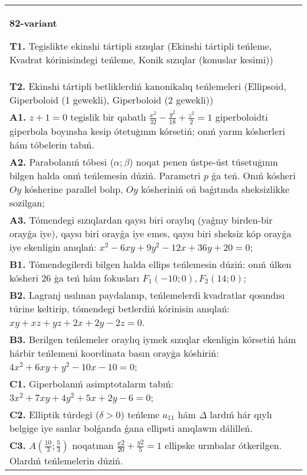 \documentclass{article}
\begin{document}
\begin{tabular}{m{17cm}}
\textbf{82-variant}
\newline

\textbf{T1.} Tegislikte ekinshi tártipli sızıqlar (Ekinshi tártipli teńleme, Kvadrat kórinisindegi teńleme, Konik sızıqlar (konuslar kesimi)) \\
\textbf{T2.} Ekinshi tártipli betliklerdiń kanonikalıq teńlemeleri (Ellipsoid, Giperboloid (1 gewekli), Giperboloid (2 gewekli)) \\
\textbf{A1.} $z+1=0$ tegislik bir qabatlı $\frac{x^2}{32}-\frac{y^2}{18}+\frac{z^2}{2}=1$ giperboloidti giperbola boyınsha kesip ótetuģının kórsetiń; onıń yarım kósherleri hám tóbelerin tabıń. \\
\textbf{A2.} Parabolanıń tóbesi ($\alpha;\beta$) noqat penen ústpe-úst túsetuģının bilgen halda onıń teńlemesin dúziń. Parametri $p$ ǵa teń. Onıń kósheri $O y$ kósherine parallel bolıp, $O y$ kósheriniń oń baǵıtında sheksizlikke sozilgan; \\
\textbf{A3.} Tómendegi sızıqlardan qaysı biri oraylıq (yaǵnıy birden-bir orayǵa iye), qaysı biri orayǵa iye emes, qaysı biri sheksiz kóp orayǵa iye ekenligin anıqlań: $x^2-6 x y+9 y^2-12 x+36 y+20=0$; \\
\textbf{B1.} Tómendegilerdi bilgen halda ellips teńlemesin dúziń: onıń úlken kósheri 26 ģa teń hám fokusları $F_1 (-10; 0), F_2 (14; 0) $; \\
\textbf{B2.} Lagranj usılınan paydalanıp, teńlemelerdi kvadratlar qosındısı túrine keltirip, tómendegi betlerdiń kórinisin anıqlań: $x y+x z+y z+2 x+2 y-2 z=0$. \\
\textbf{B3.} Berilgen teńlemeler oraylıq iymek sızıqlar ekenligin kórsetiń hám hárbir teńlemeni koordinata basın orayģa kóshiriń: $4 x^2+6 x y+y^2-10 x-10=0$; \\
\textbf{C1.} Giperbolanıń asimptotaların tabıń: $3 x^2+7 x y+4 y^2+5 x+2 y-6=0$; \\
\textbf{C2.} Elliptik túrdegi ($\delta>0$) teńleme $a_{11}$ hám $\Delta$ lardıń hár qıylı belgige iye sanlar bolǵanda ǵana ellipsti anıqlawın dálilleń. \\
\textbf{C3.} $A\left(\frac{10}{3}; \frac{5}{3}\right)$ noqatınan $\frac{x2}{20}+\frac{y2}{5}=1$ ellipske urınbalar ótkerilgen. Olardıń teńlemelerin dúziń. \\

\end{tabular}
\vspace{1cm}
\end{document}
